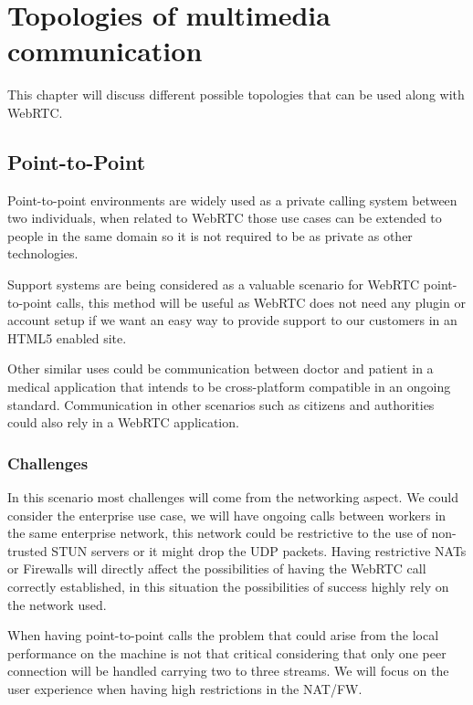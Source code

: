 \section{Topologies of multimedia communication}
\label{sec:topologies}


\thispagestyle{empty}

This chapter will discuss different possible topologies that can be used along with WebRTC.

\subsection{Point-to-Point}

Point-to-point environments are widely used as a private calling system between two individuals, when related to WebRTC those use cases can be extended to people in the same domain so it is not required to be as private as other technologies. 

Support systems are being considered as a valuable scenario for WebRTC point-to-point calls, this method will be useful as WebRTC does not need any plugin or account setup if we want an easy way to provide support to our customers in an HTML5 enabled site.

Other similar uses could be communication between doctor and patient in a medical application that intends to be cross-platform compatible in an ongoing standard. Communication in other scenarios such as citizens and authorities could also rely in a WebRTC application.
 
\subsubsection{Challenges}

In this scenario most challenges will come from the networking aspect. We could consider the enterprise use case, we will have ongoing calls between workers in the same enterprise network, this network could be restrictive to the use of non-trusted STUN servers or it might drop the UDP packets. Having restrictive NATs or Firewalls will directly affect the possibilities of having the WebRTC call correctly established, in this situation the possibilities of success highly rely on the network used.

When having point-to-point calls the problem that could arise from the local performance on the machine is not that critical considering that only one peer connection will be handled carrying two to three streams. We will focus on the user experience when having high restrictions in the NAT/FW.


